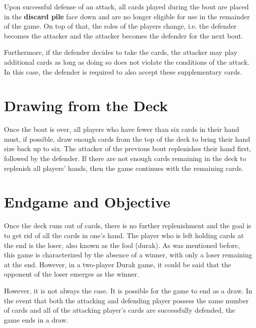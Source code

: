 Upon successful defense of an attack, all cards played during the bout are placed in the \textbf{discard pile} face down and are no longer eligible for use in the remainder of the game. On top of that, the roles of the players change, i.e. the defender becomes the attacker and the attacker becomes the defender for the next bout.

Furthermore, if the defender decides to take the cards, the attacker may play additional cards as long as doing so does not violate the conditions of the attack. In this case, the defender is required to also accept these supplementary cards.

\section{Drawing from the Deck}
Once the bout is over, all players who have fewer than six cards in their hand must, if possible, draw enough cards from the top of the deck to bring their hand size back up to six. The attacker of the previous bout replenishes their hand first, followed by the defender. If there are not enough cards remaining in the deck to replenish all players' hands, then the game continues with the remaining cards.

\section{Endgame and Objective}
Once the deck runs out of cards, there is no further replenishment and the goal is to get rid of all the cards in one's hand. The player who is left holding cards at the end is the loser, also known as the fool (durak). As was mentioned before, this game is characterized by the absence of a winner, with only a loser remaining at the end. However, in a two-player Durak game, it could be said that the opponent of the loser emerges as the winner.

However, it is not always the case. It is possible for the game to end as a draw. In the event that both the attacking and defending player possess the same number of cards and all of the attacking player's cards are successfully defended, the game ends in a draw.


